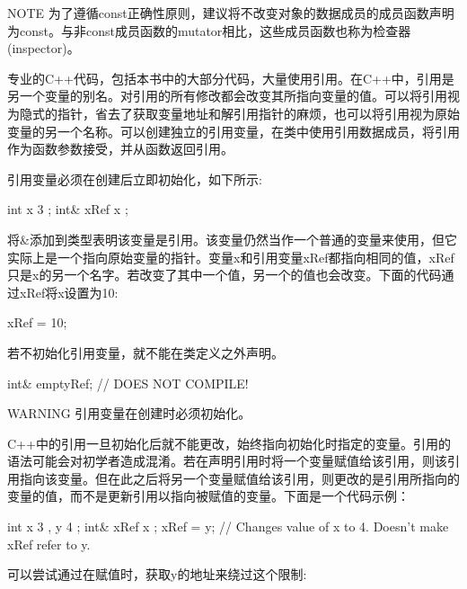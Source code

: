 \begin{myNotic}{NOTE}
为了遵循const正确性原则，建议将不改变对象的数据成员的成员函数声明为const。与非const成员函数的mutator相比，这些成员函数也称为检查器(inspector)。
\end{myNotic}


专业的C++代码，包括本书中的大部分代码，大量使用引用。在C++中，引用是另一个变量的别名。对引用的所有修改都会改变其所指向变量的值。可以将引用视为隐式的指针，省去了获取变量地址和解引用指针的麻烦，也可以将引用视为原始变量的另一个名称。可以创建独立的引用变量，在类中使用引用数据成员，将引用作为函数参数接受，并从函数返回引用。


引用变量必须在创建后立即初始化，如下所示:

\begin{cpp}
int x { 3 };
int& xRef { x };
\end{cpp}

将\&添加到类型表明该变量是引用。该变量仍然当作一个普通的变量来使用，但它实际上是一个指向原始变量的指针。变量x和引用变量xRef都指向相同的值，xRef只是x的另一个名字。若改变了其中一个值，另一个的值也会改变。下面的代码通过xRef将x设置为10:

\begin{cpp}
xRef = 10;
\end{cpp}

若不初始化引用变量，就不能在类定义之外声明。

\begin{cpp}
int& emptyRef; // DOES NOT COMPILE!
\end{cpp}

\begin{myWarning}{WARNING}
引用变量在创建时必须初始化。
\end{myWarning}


C++中的引用一旦初始化后就不能更改，始终指向初始化时指定的变量。引用的语法可能会对初学者造成混淆。若在声明引用时将一个变量赋值给该引用，则该引用指向该变量。但在此之后将另一个变量赋值给该引用，则更改的是引用所指向的变量的值，而不是更新引用以指向被赋值的变量。下面是一个代码示例：

\begin{cpp}
int x { 3 }, y { 4 };
int& xRef { x };
xRef = y; // Changes value of x to 4. Doesn't make xRef refer to y.
\end{cpp}

可以尝试通过在赋值时，获取y的地址来绕过这个限制:

